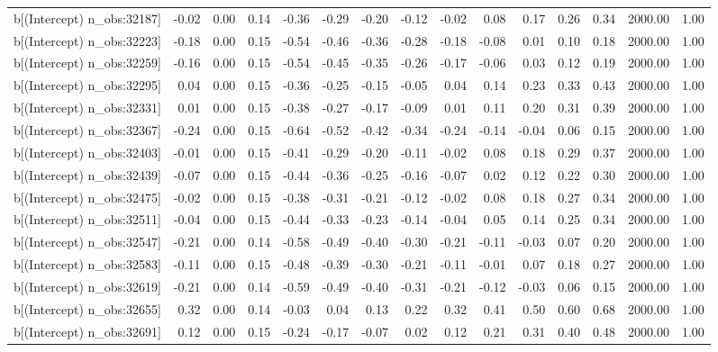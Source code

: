 \begin{table}[ht]
\begin{tabular}{rrrrrrrrrrrrrrr}
  b[(Intercept) n\_obs:32187] & -0.02 & 0.00 & 0.14 & -0.36 & -0.29 & -0.20 & -0.12 & -0.02 & 0.08 & 0.17 & 0.26 & 0.34 & 2000.00 & 1.00 \\ 
  b[(Intercept) n\_obs:32223] & -0.18 & 0.00 & 0.15 & -0.54 & -0.46 & -0.36 & -0.28 & -0.18 & -0.08 & 0.01 & 0.10 & 0.18 & 2000.00 & 1.00 \\ 
  b[(Intercept) n\_obs:32259] & -0.16 & 0.00 & 0.15 & -0.54 & -0.45 & -0.35 & -0.26 & -0.17 & -0.06 & 0.03 & 0.12 & 0.19 & 2000.00 & 1.00 \\ 
  b[(Intercept) n\_obs:32295] & 0.04 & 0.00 & 0.15 & -0.36 & -0.25 & -0.15 & -0.05 & 0.04 & 0.14 & 0.23 & 0.33 & 0.43 & 2000.00 & 1.00 \\ 
  b[(Intercept) n\_obs:32331] & 0.01 & 0.00 & 0.15 & -0.38 & -0.27 & -0.17 & -0.09 & 0.01 & 0.11 & 0.20 & 0.31 & 0.39 & 2000.00 & 1.00 \\ 
  b[(Intercept) n\_obs:32367] & -0.24 & 0.00 & 0.15 & -0.64 & -0.52 & -0.42 & -0.34 & -0.24 & -0.14 & -0.04 & 0.06 & 0.15 & 2000.00 & 1.00 \\ 
  b[(Intercept) n\_obs:32403] & -0.01 & 0.00 & 0.15 & -0.41 & -0.29 & -0.20 & -0.11 & -0.02 & 0.08 & 0.18 & 0.29 & 0.37 & 2000.00 & 1.00 \\ 
  b[(Intercept) n\_obs:32439] & -0.07 & 0.00 & 0.15 & -0.44 & -0.36 & -0.25 & -0.16 & -0.07 & 0.02 & 0.12 & 0.22 & 0.30 & 2000.00 & 1.00 \\ 
  b[(Intercept) n\_obs:32475] & -0.02 & 0.00 & 0.15 & -0.38 & -0.31 & -0.21 & -0.12 & -0.02 & 0.08 & 0.18 & 0.27 & 0.34 & 2000.00 & 1.00 \\ 
  b[(Intercept) n\_obs:32511] & -0.04 & 0.00 & 0.15 & -0.44 & -0.33 & -0.23 & -0.14 & -0.04 & 0.05 & 0.14 & 0.25 & 0.34 & 2000.00 & 1.00 \\ 
  b[(Intercept) n\_obs:32547] & -0.21 & 0.00 & 0.14 & -0.58 & -0.49 & -0.40 & -0.30 & -0.21 & -0.11 & -0.03 & 0.07 & 0.20 & 2000.00 & 1.00 \\ 
  b[(Intercept) n\_obs:32583] & -0.11 & 0.00 & 0.15 & -0.48 & -0.39 & -0.30 & -0.21 & -0.11 & -0.01 & 0.07 & 0.18 & 0.27 & 2000.00 & 1.00 \\ 
  b[(Intercept) n\_obs:32619] & -0.21 & 0.00 & 0.14 & -0.59 & -0.49 & -0.40 & -0.31 & -0.21 & -0.12 & -0.03 & 0.06 & 0.15 & 2000.00 & 1.00 \\ 
  b[(Intercept) n\_obs:32655] & 0.32 & 0.00 & 0.14 & -0.03 & 0.04 & 0.13 & 0.22 & 0.32 & 0.41 & 0.50 & 0.60 & 0.68 & 2000.00 & 1.00 \\ 
  b[(Intercept) n\_obs:32691] & 0.12 & 0.00 & 0.15 & -0.24 & -0.17 & -0.07 & 0.02 & 0.12 & 0.21 & 0.31 & 0.40 & 0.48 & 2000.00 & 1.00 \\ 

\end{tabular}
\end{table}
